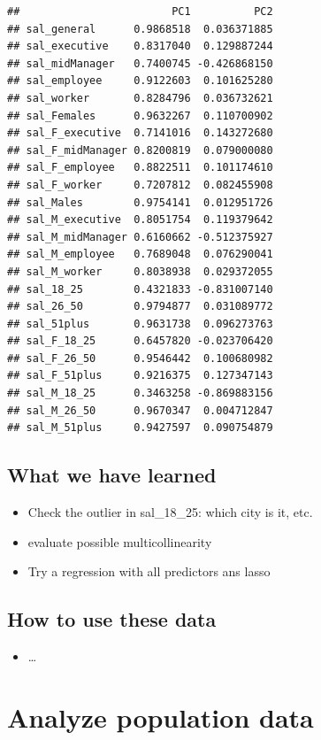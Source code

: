\documentclass[]{article}
\providecommand{\tightlist}{%
  \setlength{\itemsep}{0pt}\setlength{\parskip}{0pt}}
\begin{document}
\begin{verbatim}
##                        PC1          PC2
## sal_general      0.9868518  0.036371885
## sal_executive    0.8317040  0.129887244
## sal_midManager   0.7400745 -0.426868150
## sal_employee     0.9122603  0.101625280
## sal_worker       0.8284796  0.036732621
## sal_Females      0.9632267  0.110700902
## sal_F_executive  0.7141016  0.143272680
## sal_F_midManager 0.8200819  0.079000080
## sal_F_employee   0.8822511  0.101174610
## sal_F_worker     0.7207812  0.082455908
## sal_Males        0.9754141  0.012951726
## sal_M_executive  0.8051754  0.119379642
## sal_M_midManager 0.6160662 -0.512375927
## sal_M_employee   0.7689048  0.076290041
## sal_M_worker     0.8038938  0.029372055
## sal_18_25        0.4321833 -0.831007140
## sal_26_50        0.9794877  0.031089772
## sal_51plus       0.9631738  0.096273763
## sal_F_18_25      0.6457820 -0.023706420
## sal_F_26_50      0.9546442  0.100680982
## sal_F_51plus     0.9216375  0.127347143
## sal_M_18_25      0.3463258 -0.869883156
## sal_M_26_50      0.9670347  0.004712847
## sal_M_51plus     0.9427597  0.090754879
\end{verbatim}

\subsection{What we have learned}\label{what-we-have-learned-2}

\begin{itemize}
\tightlist
\item
  Check the outlier in sal\_18\_25: which city is it, etc.
\item
  evaluate possible multicollinearity
\item
  Try a regression with all predictors ans lasso
\end{itemize}

\subsection{How to use these data}\label{how-to-use-these-data-2}

\begin{itemize}
\tightlist
\item
  \ldots{}
\end{itemize}

\section{Analyze population data}\label{analyze-population-data}
\end{document}
